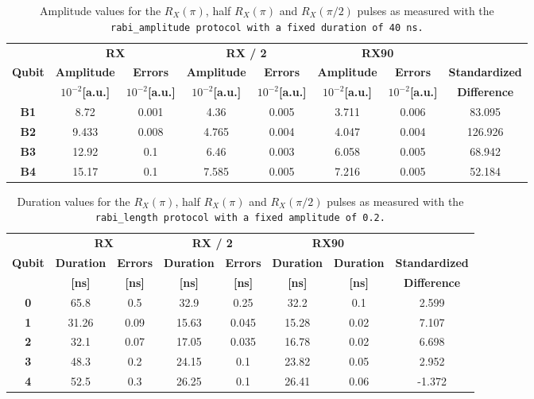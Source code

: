 \begin{table}[h!]
    \centering
    \begin{tabular}{c|cc|cc|cc|c}
        \toprule
         & \multicolumn{2}{c|}{\textbf{RX}} & \multicolumn{2}{c|}{\textbf{RX / 2}} & \multicolumn{2}{c|}{\textbf{RX90}} & \textbf{} \\
        \textbf{Qubit} & \textbf{Amplitude} & \textbf{Errors} & \textbf{Amplitude} & \textbf{Errors} & \textbf{Amplitude} & \textbf{Errors} & \textbf{Standardized} \\
         & \textbf{$10^{-2}$[a.u.]} & \textbf{$10^{-2}$[a.u.]} & \textbf{$10^{-2}$[a.u.]} & \textbf{$10^{-2}$[a.u.]} & \textbf{$10^{-2}$[a.u.]} & \textbf{$10^{-2}$[a.u.]} & \textbf{Difference}\\
        \midrule
        \textbf{B1} & 8.72   & 0.001 & 4.36   & 0.005 & 3.711  & 0.006 & 83.095\\
        \textbf{B2} & 9.433  & 0.008 & 4.765  & 0.004 & 4.047  & 0.004 & 126.926\\
        \textbf{B3} & 12.92  & 0.1   & 6.46   & 0.003 & 6.058  & 0.005 & 68.942\\
        \textbf{B4} & 15.17  & 0.1   & 7.585  & 0.005 & 7.216  & 0.005 & 52.184\\
        \bottomrule
    \end{tabular}
    \caption{Amplitude values for the $R_X(\pi)$, half $R_X(\pi)$ and $R_X(\pi/2)$ pulses as measured with the \tt{rabi\_amplitude} protocol with a fixed duration of 40 ns.}
    \label{tab:amplitude}
\end{table}

\begin{table}[h!]
    \centering
    \begin{tabular}{c|cc|cc|cc|c}
        \toprule
         & \multicolumn{2}{c|}{\textbf{RX}} & \multicolumn{2}{c|}{\textbf{RX / 2}} & \multicolumn{2}{c|}{\textbf{RX90}} & \textbf{} \\
        \textbf{Qubit} & \textbf{Duration} & \textbf{Errors} & \textbf{Duration} & \textbf{Errors} & \textbf{Duration} & \textbf{Duration} & \textbf{Standardized} \\
         & \textbf{[ns]}  & \textbf{[ns]}  & \textbf{[ns]}  & \textbf{[ns]} & \textbf{[ns]} & \textbf{[ns]} & \textbf{Difference} \\
        \midrule
        \textbf{0} & 65.8 & 0.5 & 32.9 & 0.25 & 32.2 & 0.1 & 2.599 \\
        \textbf{1} & 31.26 & 0.09 & 15.63 & 0.045 & 15.28 & 0.02 & 7.107\\
        \textbf{2} & 32.1 & 0.07 & 17.05 & 0.035 & 16.78 & 0.02 & 6.698\\
        \textbf{3} & 48.3 & 0.2 & 24.15 & 0.1 & 23.82 & 0.05 & 2.952 \\
        \textbf{4} & 52.5 & 0.3 & 26.25 & 0.1 & 26.41 & 0.06 & -1.372\\
    \end{tabular}
    \caption{Duration values for the $R_X(\pi)$, half $R_X(\pi)$ and $R_X(\pi/2)$ pulses as measured with the \tt{rabi\_length} protocol with a fixed amplitude of 0.2.}
    \label{tab:length}
\end{table}


